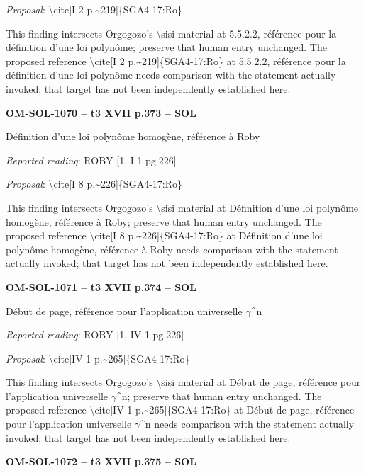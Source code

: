 \emph{Proposal}: \textbackslash{}cite[I 2 p.\textasciitilde{}219]\{SGA4-17:Ro\}\par
This finding intersects Orgogozo's \textbackslash{}sisi material at 5.5.2.2, référence pour la définition d'une loi polynôme; preserve that human entry unchanged. The proposed reference \textbackslash{}cite[I 2 p.\textasciitilde{}219]\{SGA4-17:Ro\} at 5.5.2.2, référence pour la définition d'une loi polynôme needs comparison with the statement actually invoked; that target has not been independently established here.\par
\par\noindent\textbf{OM-SOL-1070 -- t3 XVII p.373 -- SOL}\par
Définition d'une loi polynôme homogène, référence à Roby\par
\emph{Reported reading}: ROBY [1, I 1 pg.226]\par
\emph{Proposal}: \textbackslash{}cite[I 8 p.\textasciitilde{}226]\{SGA4-17:Ro\}\par
This finding intersects Orgogozo's \textbackslash{}sisi material at Définition d'une loi polynôme homogène, référence à Roby; preserve that human entry unchanged. The proposed reference \textbackslash{}cite[I 8 p.\textasciitilde{}226]\{SGA4-17:Ro\} at Définition d'une loi polynôme homogène, référence à Roby needs comparison with the statement actually invoked; that target has not been independently established here.\par
\par\noindent\textbf{OM-SOL-1071 -- t3 XVII p.374 -- SOL}\par
Début de page, référence pour l'application universelle \ensuremath{\gamma}\textasciicircum{}n\par
\emph{Reported reading}: ROBY [1, IV 1 pg.226]\par
\emph{Proposal}: \textbackslash{}cite[IV 1 p.\textasciitilde{}265]\{SGA4-17:Ro\}\par
This finding intersects Orgogozo's \textbackslash{}sisi material at Début de page, référence pour l'application universelle \ensuremath{\gamma}\textasciicircum{}n; preserve that human entry unchanged. The proposed reference \textbackslash{}cite[IV 1 p.\textasciitilde{}265]\{SGA4-17:Ro\} at Début de page, référence pour l'application universelle \ensuremath{\gamma}\textasciicircum{}n needs comparison with the statement actually invoked; that target has not been independently established here.\par
\par\noindent\textbf{OM-SOL-1072 -- t3 XVII p.375 -- SOL}\par
